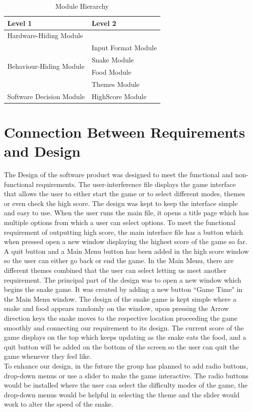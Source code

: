 \documentclass[12pt, titlepage]{article}
\begin{document}
\begin{table}[h!]
\centering
\begin{tabular}{p{} p{}}
\toprule
\textbf{Level 1} & \textbf{Level 2}\\
\midrule

{Hardware-Hiding Module} & ~ \\
\midrule

\multirow{4}{0.3\textwidth}{Behaviour-Hiding Module} &  Input Format Module\\
& Snake Module\\
& Food Module\\
& Themes Module\\
\midrule

\multirow{1}{0.3\textwidth}{Software Decision Module} & HighScore Module\\
\bottomrule

\end{tabular}
\caption{Module Hierarchy}
\label{TblMH}
\end{table}

\section{Connection Between Requirements and Design} \label{SecConnection}
The Design of the software product was designed to meet the functional and non-functional 
requirements. The user-interference file displays the game interface that allows the user to either start
the game or to select different modes, themes or even check the high score. The design was kept to 
keep the interface simple and easy to use. When the user runs the main file, it opens a title page
which has multiple options from which a user can select options. To meet the functional requirement 
of outputting high score, the main interface file has a button which when pressed open a new window 
displaying the highest score of the game so far. A quit button and a Main Menu button has been 
added in the high score window so the user can either go back or end the game. In the Main Menu, 
there are different themes combined that the user can select letting us meet another requirement. 
The principal part of the design was to open a new window which begins the snake game. It was 
created by adding a new button ``Game Time" in the Main Menu window. The design of the snake 
game is kept simple where a snake and food appears randomly on the window, upon pressing the 
Arrow direction keys the snake moves to the respective location proceeding the game smoothly and 
connecting our requirement to its design. The current score of the game displays on the top which 
keeps updating as the snake eats the food, and a quit button will be added on the bottom of the 
screen so the user can quit the game whenever they feel like.\\
To enhance our design, in the future the group has planned to add radio buttons, drop-down menus or 
use a slider to make the game interactive. The radio buttons would be installed where the user can 
select the difficulty modes of the game, the drop-down menus would be helpful in selecting the theme 
and the slider would work to alter the speed of the snake.
\end{document}
